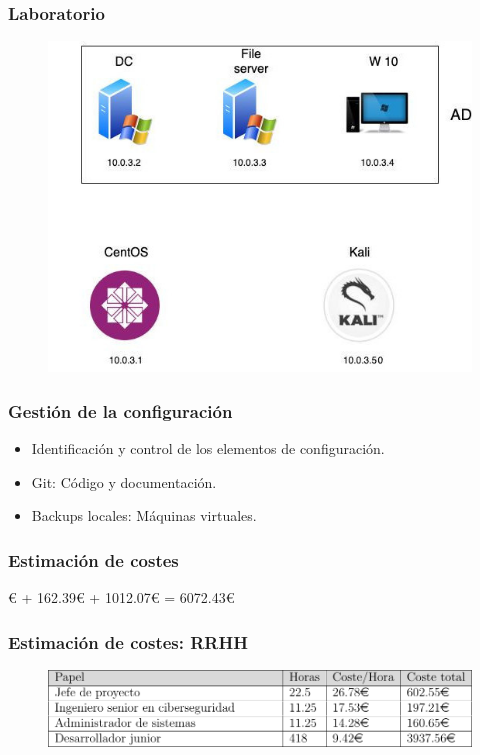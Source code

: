 \documentclass[a4paper,10pt]{beamer}
\newcommand{\linej}{\hfill\break}
\begin{document}
\begin{frame}[fragile]
	\frametitle{Laboratorio}

	\begin{figure}[H]
		\centering
		\includegraphics[width=.8\textwidth]{../figuras/virtual_machines.jpg}
	\end{figure}
\end{frame}

\begin{frame}[fragile]
	\frametitle{Gestión de la configuración}

	\begin{itemize}
		\item Identificación y control de los elementos de configuración. %
		\item Git: Código y documentación.
		\item Backups locales: Máquinas virtuales.
	\end{itemize}
\end{frame}


\begin{frame}[fragile]
	\frametitle{Estimación de costes}

\begin{center}
\linej
4897.97\euro{} + 162.39\euro{} + 1012.07\euro{} = 6072.43\euro{}
\end{center}

\end{frame}


\begin{frame}[fragile]
	\frametitle{Estimación de costes: RRHH}

	\begin{figure}[H]
		\centering
		\includegraphics[width=.8\textwidth]{figuras/rrhh.png}
	\end{figure}
\end{frame}
\end{document}
